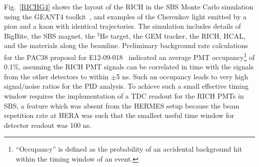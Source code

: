 Fig.~\ref{RICHG4} shows the layout of the RICH in the SBS Monte Carlo simulation using the GEANT4 toolkit~\cite{GEANT42003}, and examples of the Cherenkov light emitted by a pion and a kaon with identical trajectories. The simulation includes details of BigBite, the SBS magnet, the $^3$He target, the GEM tracker, the RICH, HCAL, and the materials along the beamline. Preliminary background rate calculations for the PAC38 proposal for E12-09-018~\cite{SBS_SIDIS} indicated an average PMT occupancy\footnote{``Occupancy'' is defined as the probability of an accidental background hit within the timing window of an event.} of 0.1\%, assuming the RICH PMT signals can be correlated in time with the signals from the other detectors to within $\pm$5 ns. Such an occupancy leads to very high signal/noise ratios for the PID analysis. To achieve such a small effective timing window requires the implementation of a TDC readout for the RICH PMTs in SBS, a feature which was absent from the HERMES setup because the beam repetition rate at HERA was such that the smallest useful time window for detector readout was 100 ns.

